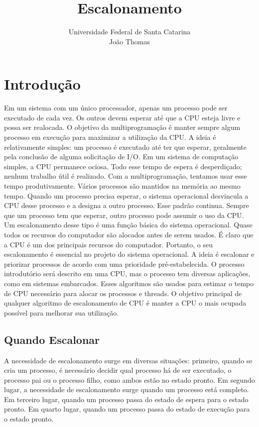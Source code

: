 \documentclass{article}
\title{Escalonamento}
\author{Universidade Federal de Santa Catarina\\João Thomas}
\begin{document}
\maketitle

\section{Introdução}
Em um sistema com um único processador, apenas um processo pode ser executado de cada vez. Os outros devem esperar até que a CPU esteja livre e possa ser realocada. O objetivo da multiprogramação é manter sempre algum processo em execução para maximizar a utilização da CPU. A ideia é relativamente simples: um processo é executado até ter que esperar, geralmente pela conclusão de alguma solicitação de I/O. Em um sistema de computação simples, a CPU permanece ociosa. Todo esse tempo de espera é desperdiçado; nenhum trabalho útil é realizado. Com a multiprogramação, tentamos usar esse tempo produtivamente. Vários processos são mantidos na memória ao mesmo tempo. Quando um processo precisa esperar, o sistema operacional desvincula a CPU desse processo e a designa a outro processo. Esse padrão continua. Sempre que um processo tem que esperar, outro processo pode assumir o uso da CPU. Um escalonamento desse tipo é uma função básica do sistema operacional. Quase todos os recursos do computador são alocados antes de serem usados. É claro que a CPU é um dos principais recursos do computador. Portanto, o seu escalonamento é essencial no projeto do sistema operacional. A ideia é escalonar e priorizar processos de acordo com uma prioridade pré-estabelecida. O processo introdutório será descrito em uma CPU, mas o processo tem diversas aplicações, como em sistemas embarcados. Esses algoritmos são usados para estimar o tempo de CPU necessário para alocar os processos e threads. O objetivo principal de qualquer algoritmo de escalonamento de CPU é manter a CPU o mais ocupada possível para melhorar sua utilização.

\subsection{Quando Escalonar}
A necessidade de escalonamento surge em diversas situações: primeiro, quando se cria um processo, é necessário decidir qual processo há de ser executado, o processo pai ou o processo filho, como ambos estão no estado pronto. Em segundo lugar, a necessidade de escalonamento surge quando um processo está completo. Em terceiro lugar, quando um processo passa do estado de espera para o estado pronto. Em quarto lugar, quando um processo passa do estado de execução para o estado pronto.
\end{document}
